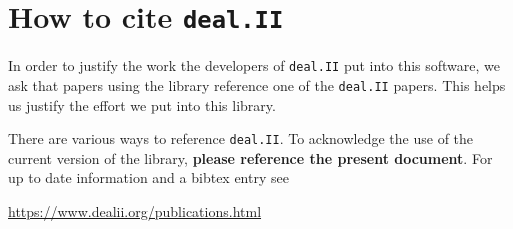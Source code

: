 \documentclass{ansarticle-preprint}
\newcommand{\specialword}[1]{\texttt{#1}}
\newcommand{\dealii}{{\specialword{deal.II}}\xspace}
\begin{document}
\section{How to cite \dealii}\label{sec:cite}

In order to justify the work the developers of \dealii{} put into this
software, we ask that papers using the library reference one of the
\dealii{} papers. This helps us justify the effort we put into this library.

There are various ways to reference \dealii{}. To acknowledge the use of
the current version of the library, \textbf{please reference the present
  document}. For up to date information and a bibtex entry
see
\begin{center}
  \url{https://www.dealii.org/publications.html}
\end{center}
\end{document}
